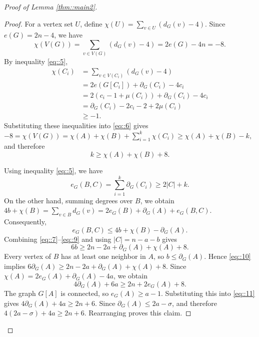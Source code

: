 \documentclass[11pt]{article}
\theoremstyle{definition}
\begin{document}
\begin{proof}[Proof of Lemma \ref{thm::main2}]
\begin{proof}
    For a vertex set $U$, define $\chi(U)=\sum_{v\in U}(d_G(v)-4)$. Since $e(G)=2n-4$, we have
    \begin{equation}\label{eq::6}
      \chi(V(G))=\sum_{v\in V(G)}(d_G(v)-4)=2e(G)-4n=-8.
    \end{equation}
    By inequality \eqref{eq::5},
    \begin{equation*}
      \begin{aligned}
        \chi(C_i)
         & =\sum_{v\in V(C_i)}(d_G(v)-4)           \\
         & =2e(G[C_i])+\partial_G(C_i)-4c_i        \\
         & =2(c_i-1+\mu(C_i))+\partial_G(C_i)-4c_i \\
         & =\partial_G(C_i)-2c_i-2+2\mu(C_i)       \\
         & \geq-1.
      \end{aligned}
    \end{equation*}
    Substituting these inequalities into \eqref{eq::6} gives
    $
      -8= \chi(V(G))=\chi(A)+\chi(B)+\sum_{i=1}^k\chi(C_i)
      \geq \chi(A)+\chi(B)-k,
    $
    and therefore
    \begin{equation}\label{eq::7}
      k\ge\chi(A)+\chi(B)+8.
    \end{equation}

    Using inequality \eqref{eq::5}, we have
    \begin{equation}\label{eq::8}
      e_G(B,C)=\sum_{i=1}^k\partial_G(C_i)\geq2|C|+k.
    \end{equation}
    On the other hand, summing degrees over $B$, we obtain
    $4b+\chi(B)=\sum_{v\in B}d_G(v)=2e_G(B)+\partial_G(A)+e_G(B,C)$.
    Consequently,
    \begin{equation}\label{eq::9}
      e_G(B,C)\leq 4b+\chi(B)-\partial_G(A).
    \end{equation}
    Combining \eqref{eq::7}--\eqref{eq::9} and using $|C|=n-a-b$ gives
    \begin{equation}\label{eq::10}
      6b\geq 2n-2a+\partial_G(A)+\chi(A)+8.
    \end{equation}
    Every vertex of $B$ has at least one neighbor in $A$, so $b\le \partial_G(A)$. Hence \eqref{eq::10} implies
    $
      6\partial_G(A)\geq 2n-2a+\partial_G(A)+\chi(A)+8$.
    Since $\chi(A)=2e_G(A)+\partial_G(A)-4a$,
    we obtain
    \begin{equation}\label{eq::11}
      4\partial_G(A)+6a\geq 2n+2e_G(A)+8.
    \end{equation}
    The graph $G[A]$ is connected, so $e_G(A)\geq a-1$. Substituting this into \eqref{eq::11} gives $4\partial_G(A)+4a\geq 2n+6$. Since $\partial_G(A)\leq2a-\sigma$, and therefore $4(2a-\sigma)+4a\ge2n+6$. Rearranging proves this claim.
  \end{proof}




\end{proof}
\end{document}
